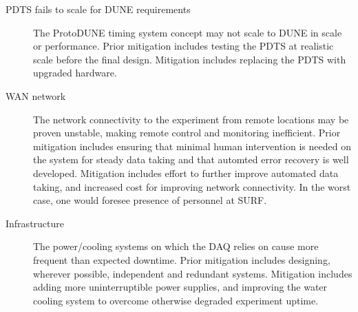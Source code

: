 \begin{description}


\item[PDTS fails to scale for DUNE requirements] The ProtoDUNE timing system concept may
  not scale to DUNE in scale or performance.  Prior mitigation
  includes testing the PDTS at realistic scale before the final
  design. Mitigation includes replacing the PDTS with upgraded
  hardware.


\item[WAN network] The network connectivity to the experiment from
  remote locations may be proven unstable, making remote control and monitoring
  inefficient. Prior mitigation includes ensuring that minimal human intervention
  is needed on the system for steady data taking and that automted
  error recovery is well developed. Mitigation includes effort to further
  improve automated data taking, and increased cost for improving network
  connectivity. In the worst case, one would foresee presence of personnel at SURF.

\item[Infrastructure] The power/cooling systems on which the DAQ
  relies on cause more frequent than expected downtime. Prior
  mitigation includes designing, wherever possible, independent and redundant
  systems. Mitigation includes adding more uninterruptible power
  supplies, and improving the water cooling system to overcome otherwise
  degraded experiment uptime. 


\end{description}
